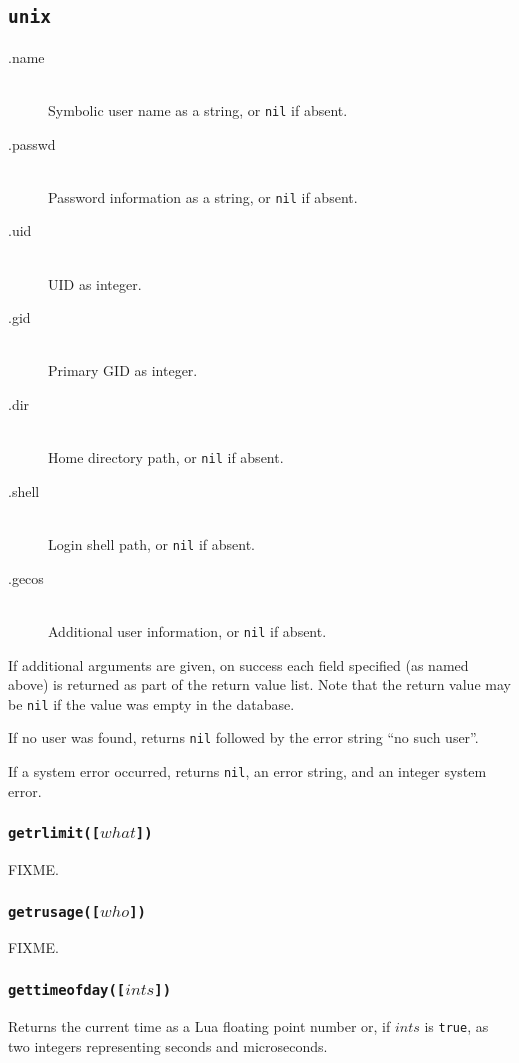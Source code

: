 \documentclass[11pt, oneside]{memoir}
\newcommand*{\true}[0]{\texttt{true}\xspace}
\newcommand*{\nil}[0]{\texttt{nil}\xspace}
\newcommand*{\fn}[1]{\texttt{#1}\xspace}
\newcounter{toccols}
\newenvironment{Module}[1]{
	\subsection{\texttt{#1}}
	\addtocontents{toc}{
		\protect\begin{multicols}{\value{toccols}}
	}
}{
	\addtocontents{toc}{\protect\end{multicols}}
}
\begin{document}
\begin{Module}{unix}
\begin{description}
\item[.name] \hfill \\
Symbolic user name as a string, or \nil if absent.
\item[.passwd] \hfill \\
Password information as a string, or \nil if absent.
\item[.uid] \hfill \\
UID as integer.
\item[.gid] \hfill \\
Primary GID as integer.
\item[.dir] \hfill \\
Home directory path, or \nil if absent.
\item[.shell] \hfill \\
Login shell path, or \nil if absent.
\item[.gecos] \hfill \\
Additional user information, or \nil if absent.
\end{description}

If additional arguments are given, on success each field specified (as named above) is returned as part of the return value list. Note that the return value may be \nil if the value was empty in the database.

If no user was found, returns \nil followed by the error string ``no such user''.

If a system error occurred, returns \nil, an error string, and an integer system error.

\subsubsection[\fn{getrlimit}]{\fn{getrlimit([$what$])}}

FIXME.

\subsubsection[\fn{getrusage}]{\fn{getrusage([$who$])}}

FIXME.

\subsubsection[\fn{gettimeofday}]{\fn{gettimeofday([$ints$])}}

Returns the current time as a Lua floating point number or, if $ints$ is \true, as two integers representing seconds and microseconds.


\end{Module}
\end{document}

